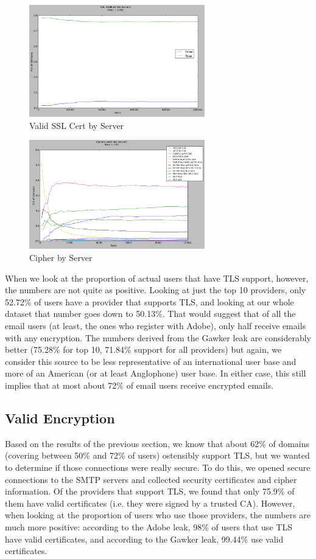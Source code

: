 \begin{figure}
    \includegraphics[width=3.0in]{images/server_verified.png}
    \caption{Valid SSL Cert by Server}
    \label{server_verified}
\end{figure}

\begin{figure}
    \includegraphics[width=3.0in]{images/server_ciphers.png}
    \caption{Cipher by Server}
    \label{server_ciphers}
\end{figure}

When we look at the proportion of actual users that have TLS support, however, 
the numbers are not quite as positive.  Looking at just the top 10 providers, 
only 52.72\% of users have a provider that supports TLS, and looking at our whole 
dataset that number goes down to 50.13\%.  That would suggest that of all the 
email users (at least, the ones who register with Adobe), only half receive 
emails with any encryption.  The numbers derived from the Gawker leak are 
considerably better (75.28\% for top 10, 71.84\% support for all providers) but 
again, we consider this source to be less representative of an international 
user base and more of an American (or at least Anglophone) user base.  In either 
case, this still implies that at most about 72\% of email users receive encrypted 
emails.

\subsection{Valid Encryption}
Based on the results of the previous section, we know that about 62\% of domains 
(covering between 50\% and 72\% of users) ostensibly support TLS, but we wanted to 
determine if those connections were really secure.  To do this, we opened secure 
connections to the SMTP servers and collected security certificates and cipher 
information.  Of the providers that support TLS, we found that only 75.9\% of 
them have valid certificates (i.e. they were signed by a trusted CA).  However, 
when looking at the proportion of users who use those providers, the numbers are 
much more positive: according to the Adobe leak, 98\% of users that use TLS have 
valid certificates, and according to the Gawker leak, 99.44\% use valid 
certificates.

